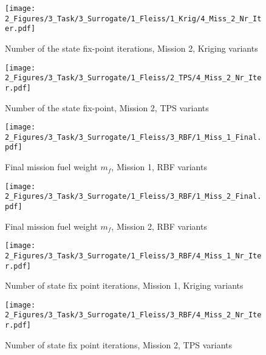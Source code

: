 \begin{figure}[!h]
    \begin{minipage}[h]{0.46\textwidth}
        \centering
        \texttt{[image: 2\_Figures/3\_Task/3\_Surrogate/1\_Fleiss/1\_Krig/4\_Miss\_2\_Nr\_Iter.pdf]}
        \caption{Number of the state fix-point iterations, Mission 2, Kriging variants}
        \label{fig_94}    
    \end{minipage}
    \hfill
    \begin{minipage}{0.46\textwidth}
        \centering
        \texttt{[image: 2\_Figures/3\_Task/3\_Surrogate/1\_Fleiss/2\_TPS/4\_Miss\_2\_Nr\_Iter.pdf]}
        \caption{Number of the state fix-point, Mission 2, TPS variants}
        \label{fig_95}    
    \end{minipage}
\end{figure} 




\begin{figure}[!h]
    \begin{minipage}[h]{0.46\textwidth}
        \centering
        \texttt{[image: 2\_Figures/3\_Task/3\_Surrogate/1\_Fleiss/3\_RBF/1\_Miss\_1\_Final.pdf]}
        \caption{Final mission fuel weight $m_f$, Mission 1, RBF variants}
        \label{fig_96}    
    \end{minipage}
    \hfill
    \begin{minipage}{0.46\textwidth}
        \centering
        \texttt{[image: 2\_Figures/3\_Task/3\_Surrogate/1\_Fleiss/3\_RBF/1\_Miss\_2\_Final.pdf]}
        \caption{Final mission fuel weight $m_f$, Mission 2, RBF variants}
        \label{fig_97}    
    \end{minipage}
\end{figure} 


\begin{figure}[!h]
    \begin{minipage}[h]{0.46\textwidth}
        \centering
        \texttt{[image: 2\_Figures/3\_Task/3\_Surrogate/1\_Fleiss/3\_RBF/4\_Miss\_1\_Nr\_Iter.pdf]}
        \caption{Number of state fix point iterations, Mission 1, Kriging variants}
        \label{fig_98}    
    \end{minipage}
    \hfill
    \begin{minipage}{0.46\textwidth}
        \centering
        \texttt{[image: 2\_Figures/3\_Task/3\_Surrogate/1\_Fleiss/3\_RBF/4\_Miss\_2\_Nr\_Iter.pdf]}
        \caption{Number of state fix point iterations, Mission 2, TPS variants}
        \label{fig_99}    
    \end{minipage}
\end{figure} 

